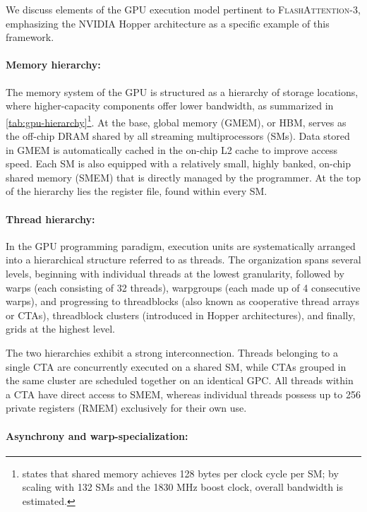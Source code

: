 We discuss elements of the GPU execution model pertinent to \textsc{FlashAttention-3}, emphasizing the NVIDIA Hopper architecture as a specific example of this framework.

\paragraph{Memory hierarchy:} The memory system of the GPU is structured as a hierarchy of storage locations, where higher-capacity components offer lower bandwidth, as summarized in \cref{tab:gpu-hierarchy}\footnote{\citet{luo2024benchmarking} states that shared memory achieves 128 bytes per clock cycle per SM; by scaling with 132 SMs and the 1830 MHz boost clock, overall bandwidth is estimated.}. At the base, global memory (GMEM), or HBM, serves as the off-chip DRAM shared by all streaming multiprocessors (SMs). Data stored in GMEM is automatically cached in the on-chip L2 cache to improve access speed. Each SM is also equipped with a relatively small, highly banked, on-chip shared memory (SMEM) that is directly managed by the programmer. At the top of the hierarchy lies the register file, found within every SM.

\paragraph{Thread hierarchy:} In the GPU programming paradigm, execution units are systematically arranged into a hierarchical structure referred to as threads. The organization spans several levels, beginning with individual threads at the lowest granularity, followed by warps (each consisting of 32 threads), warpgroups (each made up of 4 consecutive warps), and progressing to threadblocks (also known as cooperative thread arrays or CTAs), threadblock clusters (introduced in Hopper architectures), and finally, grids at the highest level.

The two hierarchies exhibit a strong interconnection. Threads belonging to a single CTA are concurrently executed on a shared SM, while CTAs grouped in the same cluster are scheduled together on an identical GPC. All threads within a CTA have direct access to SMEM, whereas individual threads possess up to 256 private registers (RMEM) exclusively for their own use.

\paragraph{Asynchrony and warp-specialization:}


